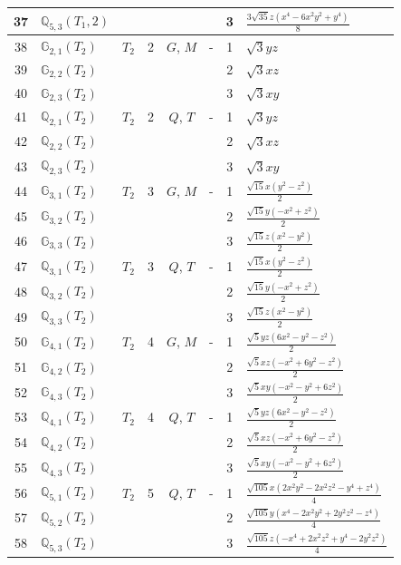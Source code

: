 \documentclass[fleqn,10pt,landscape]{jsarticle}
\begin{document}
\begin{longtable}[l]{clcccccl}
37 & $\mathbb{Q}_{5,3}(T_{1},2)$ &  &  &  &  & 3 & $\frac{3 \sqrt{35} z \left(x^{4} - 6 x^{2} y^{2} + y^{4}\right)}{8}$ \\ \hline
38 & $\mathbb{G}_{2,1}(T_{2})$ & $T_{2}$ & 2 & $G$, $M$ & - & 1 & $\sqrt{3} y z$ \\
39 & $\mathbb{G}_{2,2}(T_{2})$ &  &  &  &  & 2 & $\sqrt{3} x z$ \\
40 & $\mathbb{G}_{2,3}(T_{2})$ &  &  &  &  & 3 & $\sqrt{3} x y$ \\ \hline
41 & $\mathbb{Q}_{2,1}(T_{2})$ & $T_{2}$ & 2 & $Q$, $T$ & - & 1 & $\sqrt{3} y z$ \\
42 & $\mathbb{Q}_{2,2}(T_{2})$ &  &  &  &  & 2 & $\sqrt{3} x z$ \\
43 & $\mathbb{Q}_{2,3}(T_{2})$ &  &  &  &  & 3 & $\sqrt{3} x y$ \\ \hline
44 & $\mathbb{G}_{3,1}(T_{2})$ & $T_{2}$ & 3 & $G$, $M$ & - & 1 & $\frac{\sqrt{15} x \left(y^{2} - z^{2}\right)}{2}$ \\
45 & $\mathbb{G}_{3,2}(T_{2})$ &  &  &  &  & 2 & $\frac{\sqrt{15} y \left(- x^{2} + z^{2}\right)}{2}$ \\
46 & $\mathbb{G}_{3,3}(T_{2})$ &  &  &  &  & 3 & $\frac{\sqrt{15} z \left(x^{2} - y^{2}\right)}{2}$ \\ \hline
47 & $\mathbb{Q}_{3,1}(T_{2})$ & $T_{2}$ & 3 & $Q$, $T$ & - & 1 & $\frac{\sqrt{15} x \left(y^{2} - z^{2}\right)}{2}$ \\
48 & $\mathbb{Q}_{3,2}(T_{2})$ &  &  &  &  & 2 & $\frac{\sqrt{15} y \left(- x^{2} + z^{2}\right)}{2}$ \\
49 & $\mathbb{Q}_{3,3}(T_{2})$ &  &  &  &  & 3 & $\frac{\sqrt{15} z \left(x^{2} - y^{2}\right)}{2}$ \\ \hline
50 & $\mathbb{G}_{4,1}(T_{2})$ & $T_{2}$ & 4 & $G$, $M$ & - & 1 & $\frac{\sqrt{5} y z \left(6 x^{2} - y^{2} - z^{2}\right)}{2}$ \\
51 & $\mathbb{G}_{4,2}(T_{2})$ &  &  &  &  & 2 & $\frac{\sqrt{5} x z \left(- x^{2} + 6 y^{2} - z^{2}\right)}{2}$ \\
52 & $\mathbb{G}_{4,3}(T_{2})$ &  &  &  &  & 3 & $\frac{\sqrt{5} x y \left(- x^{2} - y^{2} + 6 z^{2}\right)}{2}$ \\ \hline
53 & $\mathbb{Q}_{4,1}(T_{2})$ & $T_{2}$ & 4 & $Q$, $T$ & - & 1 & $\frac{\sqrt{5} y z \left(6 x^{2} - y^{2} - z^{2}\right)}{2}$ \\
54 & $\mathbb{Q}_{4,2}(T_{2})$ &  &  &  &  & 2 & $\frac{\sqrt{5} x z \left(- x^{2} + 6 y^{2} - z^{2}\right)}{2}$ \\
55 & $\mathbb{Q}_{4,3}(T_{2})$ &  &  &  &  & 3 & $\frac{\sqrt{5} x y \left(- x^{2} - y^{2} + 6 z^{2}\right)}{2}$ \\ \hline
56 & $\mathbb{Q}_{5,1}(T_{2})$ & $T_{2}$ & 5 & $Q$, $T$ & - & 1 & $\frac{\sqrt{105} x \left(2 x^{2} y^{2} - 2 x^{2} z^{2} - y^{4} + z^{4}\right)}{4}$ \\
57 & $\mathbb{Q}_{5,2}(T_{2})$ &  &  &  &  & 2 & $\frac{\sqrt{105} y \left(x^{4} - 2 x^{2} y^{2} + 2 y^{2} z^{2} - z^{4}\right)}{4}$ \\
58 & $\mathbb{Q}_{5,3}(T_{2})$ &  &  &  &  & 3 & $\frac{\sqrt{105} z \left(- x^{4} + 2 x^{2} z^{2} + y^{4} - 2 y^{2} z^{2}\right)}{4}$ \\
\end{longtable}
\end{document}
